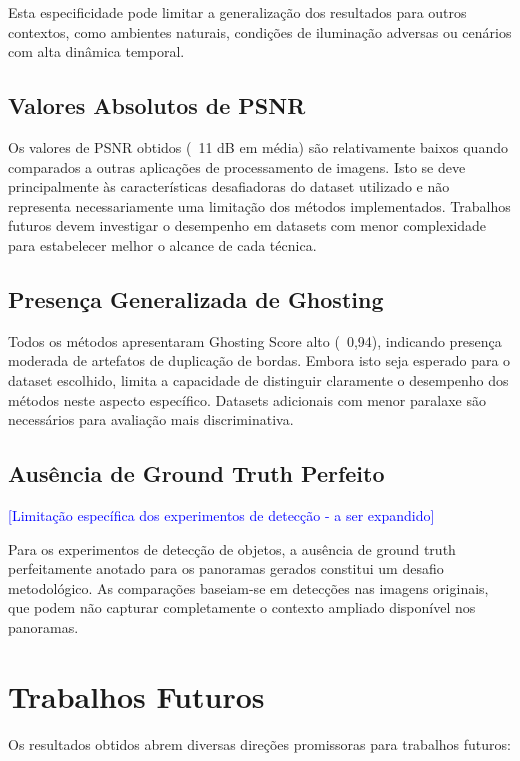 Esta especificidade pode limitar a generalização dos resultados para outros contextos, como ambientes naturais, condições de iluminação adversas ou cenários com alta dinâmica temporal.

\subsection{Valores Absolutos de PSNR}

Os valores de PSNR obtidos (~11 dB em média) são relativamente baixos quando comparados a outras aplicações de processamento de imagens. Isto se deve principalmente às características desafiadoras do dataset utilizado e não representa necessariamente uma limitação dos métodos implementados. Trabalhos futuros devem investigar o desempenho em datasets com menor complexidade para estabelecer melhor o alcance de cada técnica.

\subsection{Presença Generalizada de Ghosting}

Todos os métodos apresentaram Ghosting Score alto (~0,94), indicando presença moderada de artefatos de duplicação de bordas. Embora isto seja esperado para o dataset escolhido, limita a capacidade de distinguir claramente o desempenho dos métodos neste aspecto específico. Datasets adicionais com menor paralaxe são necessários para avaliação mais discriminativa.

\subsection{Ausência de Ground Truth Perfeito}

\textcolor{blue}{[Limitação específica dos experimentos de detecção - a ser expandido]}

Para os experimentos de detecção de objetos, a ausência de ground truth perfeitamente anotado para os panoramas gerados constitui um desafio metodológico. As comparações baseiam-se em detecções nas imagens originais, que podem não capturar completamente o contexto ampliado disponível nos panoramas.

\section{Trabalhos Futuros}

Os resultados obtidos abrem diversas direções promissoras para trabalhos futuros:

